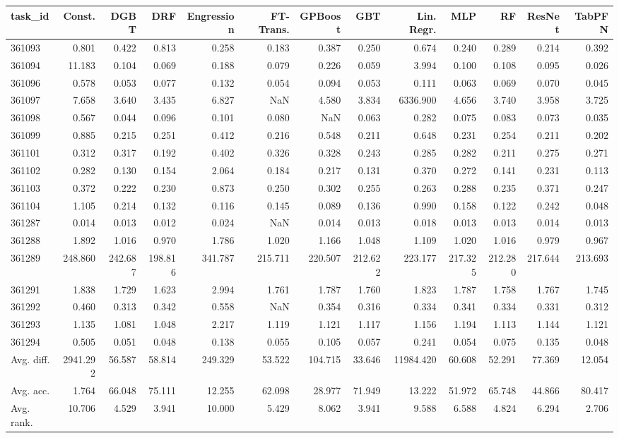 \begin{tabular}{lrrrrrrrrrrrr}
\toprule
task\_id & Const. & DGBT & DRF & Engression & FT-Trans. & GPBoost & GBT & Lin. Regr. & MLP & RF & ResNet & TabPFN \\
\midrule
361093 & 0.801 & 0.422 & 0.813 & 0.258 & 0.183 & 0.387 & 0.250 & 0.674 & 0.240 & 0.289 & 0.214 & 0.392 \\
361094 & 11.183 & 0.104 & 0.069 & 0.188 & 0.079 & 0.226 & 0.059 & 3.994 & 0.100 & 0.108 & 0.095 & 0.026 \\
361096 & 0.578 & 0.053 & 0.077 & 0.132 & 0.054 & 0.094 & 0.053 & 0.111 & 0.063 & 0.069 & 0.070 & 0.045 \\
361097 & 7.658 & 3.640 & 3.435 & 6.827 & NaN & 4.580 & 3.834 & 6336.900 & 4.656 & 3.740 & 3.958 & 3.725 \\
361098 & 0.567 & 0.044 & 0.096 & 0.101 & 0.080 & NaN & 0.063 & 0.282 & 0.075 & 0.083 & 0.073 & 0.035 \\
361099 & 0.885 & 0.215 & 0.251 & 0.412 & 0.216 & 0.548 & 0.211 & 0.648 & 0.231 & 0.254 & 0.211 & 0.202 \\
361101 & 0.312 & 0.317 & 0.192 & 0.402 & 0.326 & 0.328 & 0.243 & 0.285 & 0.282 & 0.211 & 0.275 & 0.271 \\
361102 & 0.282 & 0.130 & 0.154 & 2.064 & 0.184 & 0.217 & 0.131 & 0.370 & 0.272 & 0.141 & 0.231 & 0.113 \\
361103 & 0.372 & 0.222 & 0.230 & 0.873 & 0.250 & 0.302 & 0.255 & 0.263 & 0.288 & 0.235 & 0.371 & 0.247 \\
361104 & 1.105 & 0.214 & 0.132 & 0.116 & 0.145 & 0.089 & 0.136 & 0.990 & 0.158 & 0.122 & 0.242 & 0.048 \\
361287 & 0.014 & 0.013 & 0.012 & 0.024 & NaN & 0.014 & 0.013 & 0.018 & 0.013 & 0.013 & 0.014 & 0.013 \\
361288 & 1.892 & 1.016 & 0.970 & 1.786 & 1.020 & 1.166 & 1.048 & 1.109 & 1.020 & 1.016 & 0.979 & 0.967 \\
361289 & 248.860 & 242.687 & 198.816 & 341.787 & 215.711 & 220.507 & 212.622 & 223.177 & 217.325 & 212.280 & 217.644 & 213.693 \\
361291 & 1.838 & 1.729 & 1.623 & 2.994 & 1.761 & 1.787 & 1.760 & 1.823 & 1.787 & 1.758 & 1.767 & 1.745 \\
361292 & 0.460 & 0.313 & 0.342 & 0.558 & NaN & 0.354 & 0.316 & 0.334 & 0.341 & 0.334 & 0.331 & 0.312 \\
361293 & 1.135 & 1.081 & 1.048 & 2.217 & 1.119 & 1.121 & 1.117 & 1.156 & 1.194 & 1.113 & 1.144 & 1.121 \\
361294 & 0.505 & 0.051 & 0.048 & 0.138 & 0.055 & 0.105 & 0.057 & 0.241 & 0.054 & 0.075 & 0.135 & 0.048 \\
Avg. diff. & 2941.292 & 56.587 & 58.814 & 249.329 & 53.522 & 104.715 & 33.646 & 11984.420 & 60.608 & 52.291 & 77.369 & 12.054 \\
Avg. acc. & 1.764 & 66.048 & 75.111 & 12.255 & 62.098 & 28.977 & 71.949 & 13.222 & 51.972 & 65.748 & 44.866 & 80.417 \\
Avg. rank. & 10.706 & 4.529 & 3.941 & 10.000 & 5.429 & 8.062 & 3.941 & 9.588 & 6.588 & 4.824 & 6.294 & 2.706 \\
\bottomrule
\end{tabular}
